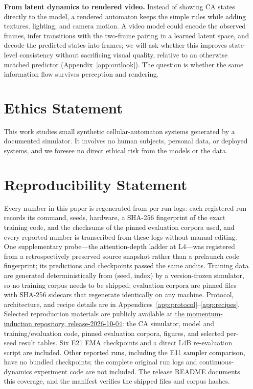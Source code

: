 \documentclass[11pt]{article}
\begin{document}
\textbf{From latent dynamics to rendered video.} Instead of showing CA states directly to the model, a rendered automaton keeps the simple rules while adding textures, lighting, and camera motion. A video model could encode the observed frames, infer transitions with the two-frame pairing in a learned latent space, and decode the predicted states into frames; we will ask whether this improves state-level consistency without sacrificing visual quality, relative to an otherwise matched predictor (Appendix~\ref{app:outlook}). The question is whether the same information flow survives perception and rendering.

\section*{Ethics Statement}
This work studies small synthetic cellular-automaton systems generated by a
documented simulator. It involves no human subjects, personal data, or
deployed systems, and we foresee no direct ethical risk from the models or the
data.

\section*{Reproducibility Statement}
Every number in this paper is regenerated from per-run logs: each registered
run records its command, seeds, hardware, a SHA-256 fingerprint of the exact
training code, and the checksums of the pinned evaluation corpora used, and
every reported number is transcribed from these logs without manual editing.
One supplementary probe---the attention-depth ladder at L4---was registered from a
retrospectively preserved source snapshot rather than a prelaunch code
fingerprint; its predictions and checkpoints passed the same audits.
Training data are generated deterministically from (seed, index) by a
version-frozen simulator, so no training corpus needs to be shipped;
evaluation corpora are pinned files with SHA-256 sidecars that regenerate
identically on any machine. Protocol, architecture, and recipe details are in
Appendices~\ref{app:protocol}--\ref{app:recipes}. Selected reproduction
materials are publicly available at
\href{https://github.com/guoshaoyang-pku/momentum-induction/tree/release-2026-10-04}{the momentum-induction repository, release-2026-10-04}:
the CA simulator, model and training/evaluation code, pinned evaluation
corpora, figures, and selected per-seed result tables. Six E21 EMA checkpoints
and a direct L4B re-evaluation script are included. Other reported runs,
including the E11 sampler comparison, have no bundled checkpoints; the
complete original run logs and continuous-dynamics experiment code are not
included. The release README documents this coverage, and the manifest
verifies the shipped files and corpus hashes.
\end{document}
